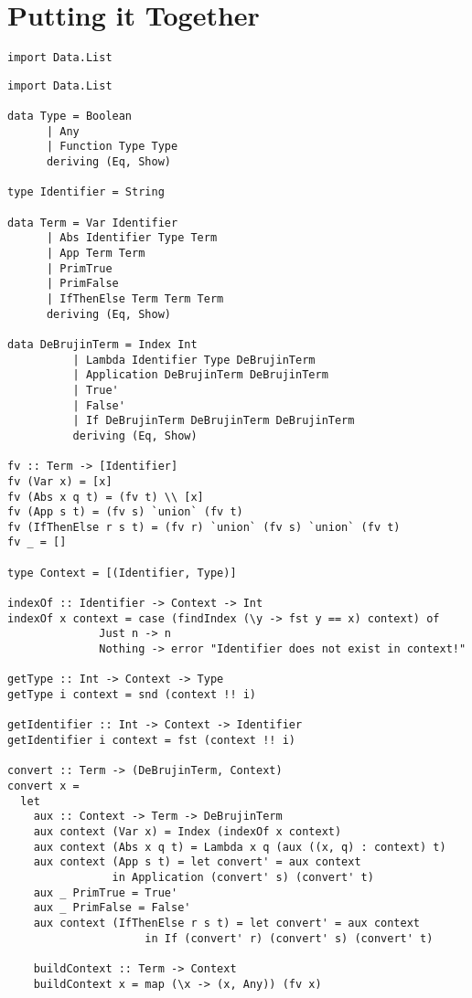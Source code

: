 \documentclass[11pt]{article}
\begin{document}
\section{Putting it Together}
\label{sec-11}
\begin{verbatim}
import Data.List
\end{verbatim}

\begin{verbatim}
import Data.List

data Type = Boolean
	  | Any
	  | Function Type Type
	  deriving (Eq, Show)

type Identifier = String

data Term = Var Identifier
	  | Abs Identifier Type Term
	  | App Term Term
	  | PrimTrue
	  | PrimFalse
	  | IfThenElse Term Term Term
	  deriving (Eq, Show)

data DeBrujinTerm = Index Int 
		  | Lambda Identifier Type DeBrujinTerm
		  | Application DeBrujinTerm DeBrujinTerm
		  | True'
		  | False'
		  | If DeBrujinTerm DeBrujinTerm DeBrujinTerm
		  deriving (Eq, Show)

fv :: Term -> [Identifier]
fv (Var x) = [x]
fv (Abs x q t) = (fv t) \\ [x]
fv (App s t) = (fv s) `union` (fv t)
fv (IfThenElse r s t) = (fv r) `union` (fv s) `union` (fv t)
fv _ = []

type Context = [(Identifier, Type)]

indexOf :: Identifier -> Context -> Int
indexOf x context = case (findIndex (\y -> fst y == x) context) of
		      Just n -> n
		      Nothing -> error "Identifier does not exist in context!"

getType :: Int -> Context -> Type
getType i context = snd (context !! i)

getIdentifier :: Int -> Context -> Identifier
getIdentifier i context = fst (context !! i)

convert :: Term -> (DeBrujinTerm, Context)
convert x =
  let
    aux :: Context -> Term -> DeBrujinTerm
    aux context (Var x) = Index (indexOf x context)
    aux context (Abs x q t) = Lambda x q (aux ((x, q) : context) t)
    aux context (App s t) = let convert' = aux context
			    in Application (convert' s) (convert' t)
    aux _ PrimTrue = True'
    aux _ PrimFalse = False'
    aux context (IfThenElse r s t) = let convert' = aux context
				     in If (convert' r) (convert' s) (convert' t)

    buildContext :: Term -> Context
    buildContext x = map (\x -> (x, Any)) (fv x)


\end{verbatim}
\end{document}

